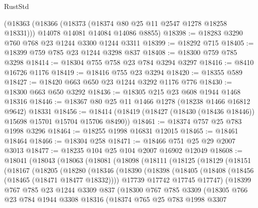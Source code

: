 \begin{lexlean}{RustStd}
\begin{coremodule}
    (@18363
      (@18366 (@18373 (@18374 @80 @25 @11 @2547 @1278 @18258 @18331)))
      @14078
      @14081
      @14084
      @14086
      @8855)
@18398 := @18283 @3290 @760 @768 @23 @1244 @3300 @1244 @3311
@18399 := @18292 @715
@18405 := @18399 @759 @785 @23 @1244 @3298 @837
@18408 := @18300 @759 @785 @3298
@18414 := @18304 @755 @758 @23 @784 @3294 @3297
@18416 := @8410 @16726 @1176
@18419 := @18416 @755 @23 @3294
@18420 := @18355 @589
@18427 := @18420 @663 @650 @23 @1244 @3292 @1176 @776
@18430 := @18300 @663 @650 @3292
@18436 := @18305 @215 @23 @608 @1944 @1468 @18316
@18446 := @18367 @80 @25 @11 @1466 @1278 (@18238 @1466 @16812 @9642) @18331
@18456 := @18414 (@18419 (@18427 (@18430 (@18436 @18446)) @15698 @15701 @15704 @15706 @8490))
@18461 := @18374 @757 @25 @783 @1998 @3296
@18464 := @18255 @1998 @16831 @12015
@18465 := @18461 @18464
@18466 := @18304 @258
@18471 := @18466 @751 @25 @29 @2007 @3013
@18477 := @18235 @104 @25 @104 @2007 @16902 @12049
@18608 := @18041
    (@18043
      (@18063
        (@18081
          (@18098
            (@18111
              (@18125
                (@18129
                  (@18151
                    (@18167
                      (@18205
                        (@18280
                          (@18346
                            (@18390
                              (@18398
                                (@18405
                                  (@18408 (@18456 (@18465 (@18471 @18477 @18332))))
                                  @17739
                                  @17742
                                  @17745
                                  @17747)
                                (@18399
                                  @767
                                  @785
                                  @23
                                  @1244
                                  @3309
                                  @837
                                  (@18300
                                    @767
                                    @785
                                    @3309
                                    (@18305
                                      @766
                                      @23
                                      @784
                                      @1944
                                      @3308
                                      @18316
                                      (@18374
                                        @765
                                        @25
                                        @783
                                        @1998
                                        @3307

\end{coremodule}
\end{lexlean}
